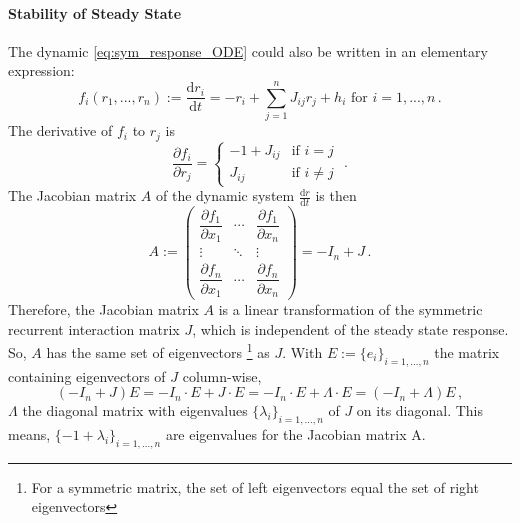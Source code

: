 \documentclass[11pt]{article}
\begin{document}
	\paragraph{Stability of Steady State}
	The dynamic \ref{eq:sym_response_ODE} could also be written in an elementary expression:
		\begin{equation}
			 f_i (r_1, ..., r_n) := \frac{\mathrm{d} r_i}{\mathrm{d} t} = - r_i + \sum_{j=1}^{n} J_{ij} r_j + h_i  \text{   for } i = 1, ..., n\, .
		\end{equation}
	The derivative of $f_i$ to $r_j$ is
		\begin{equation}
			\frac{\partial f_i}{\partial r_j} = 
			\begin{cases}
				-1 + J_{ij} & \text{if} \, \,  i = j \\
				J_{ij} & \text{if} \, \, i \neq j
			\end{cases} \, \, .
		\end{equation}
	The Jacobian matrix $A$ of the dynamic system $\frac{\mathrm{d} r}{\mathrm{d} t}$ is then
		\begin{equation} \label{eq:Jacobian_matrix}
			A := 
			 \begin{pmatrix}
				\dfrac{\partial f_1}{\partial x_1} & \cdots & \dfrac{\partial f_1}{\partial x_n}\\
				\vdots                             & \ddots & \vdots\\
				\dfrac{\partial f_n}{\partial x_1} & \cdots & \dfrac{\partial f_n}{\partial x_n}
			\end{pmatrix}
			= - I_n + J \, .
		\end{equation}
	Therefore, the Jacobian matrix $A$ is a linear transformation of the symmetric recurrent interaction matrix $J$, which is independent of the steady state response. So, $A$ has the same set of eigenvectors \footnote{For a symmetric matrix, the set of left eigenvectors equal the set of right eigenvectors} as $J$. With $E := \{e_i\}_{i = 1, ..., n}$ the matrix containing eigenvectors of $J$ column-wise, 
		\begin{equation} \label{eq:steady_state_eigenvalues_sym}
			(- I_n + J) E = - I_n \cdot E + J \cdot E = -I_n \cdot E + \Lambda \cdot E = (-I_n + \Lambda) E \, ,
		\end{equation}
	$\Lambda$ the diagonal matrix with eigenvalues $\{\lambda_i\}_{i = 1,...,n}$ of $J$ on its diagonal. This means, $\{-1 + \lambda_i\}_{i=1, ..., n}$ are eigenvalues for the Jacobian matrix A. 
	
\end{document}

